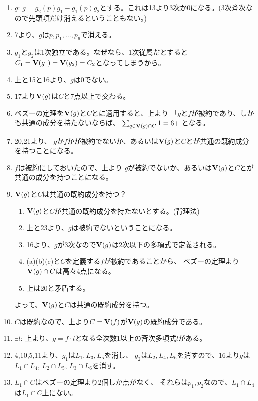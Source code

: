 \begin{myproof}
\begin{enumerate}
    \item $g$:
    $g=g_2(p)g_1 - g_1(p)g_2$とする。これは13より3次か0になる。(3次斉次なので先頭項だけ消えるということもない。)
    \item
    7より、$g$は$p,p_1,\dots,p_6$で消える。
    \item
    $g_1$と$g_2$は1次独立である。なぜなら、1次従属だとすると$C_1 = \textbf V(g_1) = \textbf V(g_2) = C_2$となってしまうから。
    \item
    上と15と16より、$g$は0でない。
    \item
    17より$\textbf V(g)$は$C$と7点以上で交わる。
    \item
    ベズーの定理を$\textbf V(g)$と$C$とに適用すると、上より
    「$g$と$f$が被約であり、しかも共通の成分を持たないならば、
      $\sum_{q \in \textbf V(g)\cap C} 1 = 6$」となる。
    \item
    20,21より、
    $g$か$f$かが被約でないか、あるいは$\textbf V(g)$と$C$とが共通の既約成分を持つことになる。
    \item
    $f$は被約にしておいたので、上より
    $g$が被約でないか、あるいは$\textbf V(g)$と$C$とが共通の成分を持つことになる。
    \item
    $\textbf V(g)$と$C$は共通の既約成分を持つ？
    \begin{enumerate}
      \item $\textbf V(g)$と$C$が共通の既約成分を持たないとする。(背理法)
      \item
        上と23より、$g$は被約でないということになる。
      \item
        16より、$g$が3次なので$\textbf V(g)$は2次以下の多項式で定義される。
      \item
        (a)(b)(c)と$C$を定義する$f$が被約であることから、
        ベズーの定理より$\textbf V(g)\cap C$は高々4点になる。
      \item
      上は20と矛盾する。
    \end{enumerate}
    よって、$\textbf V(g)$と$C$は共通の既約成分を持つ。
    \item
    $C$は既約なので、上より$C=\textbf V(f)$が$\textbf V(g)$の既約成分である。
    \item $\exists l$:
    上より、$g=f\cdot l$となる全次数1以上の斉次多項式$l$がある。
    \item
    4,10,5,11より、$g_1$は$L_1,L_3,L_5$を消し、
    $g_2$は$L_2,L_4,L_6$を消すので、16より$g$は
    $L_1\cap L_4,\, L_2 \cap L_5,\, L_3 \cap L_6$を消す。
    \item
    $L_1 \cap C$はベズーの定理より2個しか点がなく、
    それらは$p_1,p_2$なので、$L_1\cap L_4$は$L_1\cap C$上にない。

\end{enumerate}
\end{myproof}
